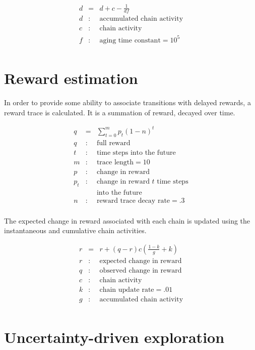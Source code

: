 \documentclass[oneside,twocolumn]{article}
\begin{document}
\begin{eqnarray*}
d &= & d + c - \frac{1}{df}\\ 
d &:& \mbox{accumulated chain activity} \\
c &:& \mbox{chain activity} \\
f &:& \mbox{aging time constant} = 10^5 \\
\end{eqnarray*}

\section*{\color{copper} Reward estimation}

In order to provide some ability to associate transitions with delayed rewards, a reward trace is calculated. It is a summation of reward, decayed over time.

\begin{eqnarray*}
q &= & \sum_{t=0}^m p_t (1 - n)^{t}\\ 
q &:& \mbox{full reward} \\
t &:& \mbox{time steps into the future} \\
m &:& \mbox{trace length} = 10\\
p &:& \mbox{change in reward}\\
p_t &:& \mbox{change in reward $t$ time steps}\\
&& \mbox{into the future}\\
n &:& \mbox{reward trace decay rate} = .3\\
\end{eqnarray*}

The expected change in reward associated with each chain is updated using the instantaneous and cumulative chain activities.

\begin{eqnarray*}
r &= & r + (q - r)c \left ( \frac{1 - k}{g} + k \right)\\ 
r &:& \mbox{expected change in reward} \\
q &:& \mbox{observed change in reward} \\
c &:& \mbox{chain activity} \\
k &:& \mbox{chain update rate} = .01 \\
g &:& \mbox{accumulated chain activity} \\
\end{eqnarray*}

\section*{\color{copper} Uncertainty-driven exploration}
\end{document}
